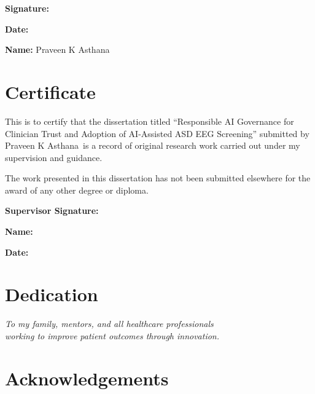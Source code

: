 \documentclass[12pt,a4paper,oneside]{report}
\newcommand{\thesistitle}{Responsible AI Governance for Clinician Trust and Adoption of AI-Assisted ASD EEG Screening}
\newcommand{\authorname}{Praveen K Asthana}
\begin{document}
\noindent\textbf{Signature:} \underline{\hspace{6cm}}

\vspace{1cm}

\noindent\textbf{Date:} \underline{\hspace{6cm}}

\vspace{1cm}

\noindent\textbf{Name:} \authorname

\chapter*{Certificate}

This is to certify that the dissertation titled ``\thesistitle'' submitted by \authorname\ is a record of original research work carried out under my supervision and guidance.

The work presented in this dissertation has not been submitted elsewhere for the award of any other degree or diploma.

\vspace{2cm}

\noindent\textbf{Supervisor Signature:} \underline{\hspace{5cm}}

\vspace{1cm}

\noindent\textbf{Name:} \underline{\hspace{6cm}}

\vspace{1cm}

\noindent\textbf{Date:} \underline{\hspace{6cm}}

\chapter*{Dedication}

\begin{center}
\vspace*{3cm}
\textit{To my family, mentors, and all healthcare professionals\\
working to improve patient outcomes through innovation.}
\end{center}

\chapter*{Acknowledgements}
\end{document}
